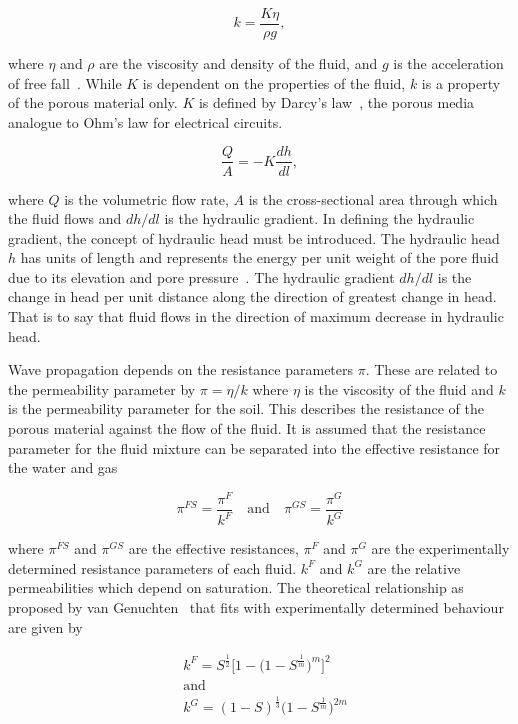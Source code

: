 \documentclass[twocolumn]{article}
\begin{document}
\begin{equation}
    k = \frac{K\eta}{\rho{g}},
\end{equation}

where $\eta$ and $\rho$ are the viscosity and density of the fluid, and $g$ is the acceleration of free fall~\cite{wang_2000}. While $K$ is dependent on the properties of the fluid, $k$ is a property of the porous material only. $K$ is defined by Darcy’s law~\cite{kirkham_2014}, the porous media analogue to Ohm’s law for electrical circuits.

\begin{equation*}
    \frac{Q}{A} = -K\frac{dh}{dl},
\end{equation*}

where $Q$ is the volumetric flow rate, $A$ is the cross-sectional area through which the fluid flows and $dh/dl$ is the hydraulic gradient. In defining the hydraulic gradient, the concept of hydraulic head must be introduced. The hydraulic head $h$ has units of length and represents the energy per unit weight of the pore fluid due to its elevation and pore pressure~\cite{hemond_fechner_2015}. The hydraulic gradient $dh/dl$ is the change in head per unit distance along the direction of greatest change in head. That is to say that fluid flows in the direction of maximum decrease in hydraulic head.

Wave propagation depends on the resistance parameters $\pi$. These are related to the permeability parameter by $\pi = \eta/k$ where $\eta$ is the viscosity of the fluid and $k$ is the permeability parameter for the soil. This describes the resistance of the porous material against the flow of the fluid. It is assumed that the resistance parameter for the fluid mixture can be separated into the effective resistance for the water and gas

\begin{equation*}
    \pi^{FS}= \frac{\pi^F}{k^F}\quad \text{and} \quad \pi^{GS}=\frac{\pi^G}{k^G}
\end{equation*}

where $\pi^{FS}$ and $\pi^{GS}$ are the effective resistances, $\pi^F$ and $\pi^G$ are the experimentally determined resistance parameters of each fluid. $k^F$ and $k^G$ are the relative permeabilities which depend on saturation. The theoretical relationship as proposed by van Genuchten~\cite{van_genuchten_1980} that fits with experimentally determined behaviour~\cite{wyckoff_botset_1936} are given by

\begin{align*}
     & k^F = S^{\frac{1}{2}}\bigl[1 - \bigl(1-S^{\frac{1}{m}}\bigr)^m\bigr]^2 \\
     & \text{and}                                                             \\
     & k^G = (1-S)^{\frac{1}{3}}\bigl(1 - S^{\frac{1}{m}}\bigr)^{2m}
\end{align*}
\end{document}
